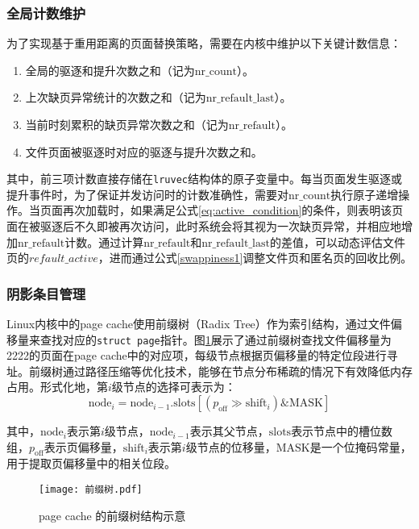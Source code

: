 \subsubsection{全局计数维护}

为了实现基于重用距离的页面替换策略，需要在内核中维护以下关键计数信息：

\begin{enumerate}
  \item 全局的驱逐和提升次数之和（记为\(\mathrm{nr\_count}\)）。
  \item 上次缺页异常统计的次数之和（记为\(\mathrm{nr\_refault\_last}\)）。
  \item 当前时刻累积的缺页异常次数之和（记为\(\mathrm{nr\_refault}\)）。
  \item 文件页面被驱逐时对应的驱逐与提升次数之和。
\end{enumerate}

其中，前三项计数直接存储在\texttt{lruvec}结构体的原子变量中。每当页面发生驱逐或提升事件时，为了保证并发访问时的计数准确性，需要对\(\mathrm{nr\_count}\)执行原子递增操作。当页面再次加载时，如果满足公式\ref{eq:active_condition}的条件，则表明该页面在被驱逐后不久即被再次访问，此时系统会将其视为一次缺页异常，并相应地增加\(\mathrm{nr\_refault}\)计数。通过计算\(\mathrm{nr\_refault}\)和\(\mathrm{nr\_refault\_last}\)的差值，可以动态评估文件页的\(refault\_active\)，进而通过公式\ref{swappiness1}调整文件页和匿名页的回收比例。

\subsubsection{阴影条目管理}

Linux内核中的page cache使用前缀树（Radix Tree）作为索引结构，通过文件偏移量来查找对应的\texttt{struct page}指针。图\ref{fig:前缀树}展示了通过前缀树查找文件偏移量为2222的页面在page cache中的对应项，每级节点根据页偏移量的特定位段进行寻址。前缀树通过路径压缩等优化技术，能够在节点分布稀疏的情况下有效降低内存占用。形式化地，第\(i\)级节点的选择可表示为：
\[
\text{node}_i = \text{node}_{i-1}.\text{slots}[(p_{\text{off}} \gg \text{shift}_i) \& \text{MASK}]
\]

其中，\(\text{node}_i\)表示第\(i\)级节点，\(\text{node}_{i-1}\)表示其父节点，\(\text{slots}\)表示节点中的槽位数组，\(p_{\text{off}}\)表示页偏移量，\(\text{shift}_i\)表示第\(i\)级节点的位移量，\(\text{MASK}\)是一个位掩码常量，用于提取页偏移量中的相关位段。

\begin{figure}[htbp]
  \centering
  \texttt{[image: 前缀树.pdf]}
  \caption{page cache 的前缀树结构示意}
  \label{fig:前缀树}
\end{figure}

